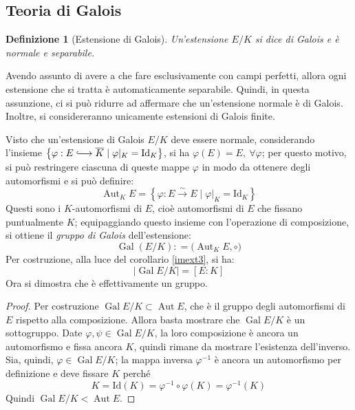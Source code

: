 \documentclass[12pt]{scrartcl}
\theoremstyle{style}
\newtheorem{definizione}{Definizione}[section]
\newenvironment{boxenv}[1][]{
    \begin{eqbox}[#1]
    }{
   \end{eqbox}
}
\numberwithin{equation}{subsection}
\newcommand{\longhookrightarrow}{\lhook\joinrel\longrightarrow}
\begin{document}
\subsection{Teoria di Galois}
\begin{definizione}
	[Estensione di Galois]
	Un'estensione $E / K$ si dice \textit{di Galois} e \`e normale e separabile.
\end{definizione}
\begin{boxenv}[]
Avendo assunto di avere a che fare esclusivamente con campi perfetti, allora ogni estensione che si tratta \`e automaticamente separabile. 
Quindi, in questa assunzione, ci si pu\`o ridurre ad affermare che un'estensione normale \`e di Galois.
Inoltre, si considereranno unicamente estensioni di Galois finite.
\end{boxenv}
\noindent Visto che un'estensione di Galois $E / K$ deve essere normale, considerando l'insieme $\left\{ \varphi : E \longhookrightarrow \overline{K} \mid \varphi |_K = \mathrm{Id} _K \right\} $, si ha $\varphi (E) = E, \ \forall \varphi $; per questo motivo, si pu\`o restringere ciascuna di queste mappe $\varphi $ in modo da ottenere degli automorfismi e si pu\`o definire:
\[
	\operatorname{Aut} _K E = \left\{ \varphi  : E \stackrel{\sim}{\longrightarrow} E  \mid \varphi |_K = \mathrm{Id} _K \right\} 
\] 
Questi sono i $K$-automorfismi di $E$, cio\`e automorfismi di $E$ che fissano puntualmente $K$; equipaggiando questo insieme con l'operazione di composizione, si ottiene il \textit{gruppo di Galois} dell'estensione:
\begin{equation}
	\operatorname{Gal} (E / K ) : = \big(\operatorname{Aut} _K E , \circ\big)
\end{equation}
Per costruzione, alla luce del corollario \ref{imext3}, si ha:
\begin{equation}
	\lvert \operatorname{Gal} E / K \rvert = [E : K]
\end{equation}
Ora si dimostra che \`e effettivamente un gruppo.
\begin{proof}
	Per costruzione $\operatorname{Gal} E / K \subset \operatorname{Aut} E$, che \`e il gruppo degli automorfismi di $E$ rispetto alla composizione. 
	Allora basta mostrare che $\operatorname{Gal} E / K$ \`e un sottogruppo.
	Date $\varphi , \psi \in \operatorname{Gal} E / K$, la loro composizione \`e ancora un automorfismo e fissa ancora $K$, quindi rimane da mostrare l'esistenza dell'inverso.
	Sia, quindi, $\varphi \in \operatorname{Gal} E / K$; la mappa inversa $\varphi ^{-1}$ \`e ancora un automorfismo per definizione e deve fissare $K$ perch\'e 
	\[
	K=\mathrm{Id}(K) = \varphi ^{-1}\circ \varphi (K) = \varphi ^{-1}(K)
	\] 
	Quindi $\operatorname{Gal} E / K < \operatorname{Aut} E$.
\end{proof}
\end{document}
